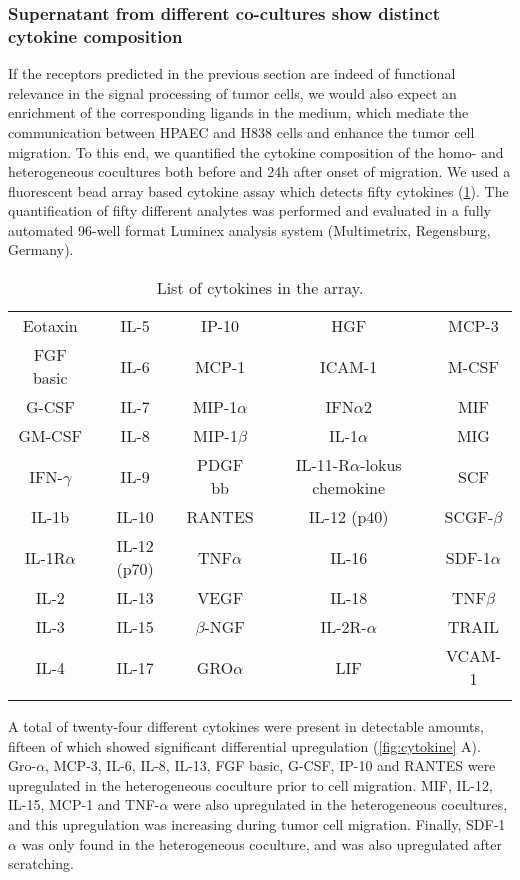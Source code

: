 \subsubsection{Supernatant  from different co-cultures show distinct cytokine composition}

If the receptors predicted in the previous section are indeed of functional
relevance in the signal processing of tumor cells, we would also expect an
enrichment of the corresponding ligands in the medium,
which mediate the communication between
HPAEC and H838 cells and enhance the tumor cell migration.
To this end, we quantified the cytokine composition
of the  homo- and heterogeneous cocultures
both before and 24h after onset of migration.
We used a  fluorescent bead array based cytokine assay which detects fifty cytokines (\ref{table:cytokine}).
The quantification of fifty different analytes was performed and evaluated in a  fully automated 96-well format Luminex analysis system (Multimetrix, Regensburg,  Germany). 

\begin{longtable}{ccccc}
\caption{List of cytokines in the array.} \\ 
\hline
Eotaxin & IL-5 &   IP-10 &  HGF & MCP-3\\
\rowcolor{Gray} FGF basic &  IL-6 &   MCP-1 &  ICAM-1 & M-CSF\\
G-CSF &  IL-7 &   MIP-1$\alpha$ & IFN$\alpha$2 & MIF\\
\rowcolor{Gray} GM-CSF & IL-8 &   MIP-1$\beta$ &  IL-1$\alpha$ & MIG\\
IFN-$\gamma$ &  IL-9&    PDGF bb&  IL-11-R$\alpha$-lokus chemokine & SCF\\
\rowcolor{Gray} IL-1b &  IL-10 &  RANTES & IL-12 (p40) & SCGF-$\beta$\\
IL-1R$\alpha$ &  IL-12 (p70) &  TNF$\alpha$ &   IL-16 &  SDF-1$\alpha$\\
\rowcolor{Gray} IL-2 &   IL-13 &  VEGF &   IL-18 &  TNF$\beta$\\
IL-3 &   IL-15 &  $\beta$-NGF&  IL-2R-$\alpha$ &   TRAIL\\
\rowcolor{Gray} IL-4 &   IL-17 &  GRO$\alpha$ &  LIF &VCAM-1\\
\hline
\label{table:cytokine}
\end{longtable}
\newpage

A total of twenty-four different cytokines were present in detectable amounts,
fifteen of which showed significant differential upregulation
(\ref{fig:cytokine} A).
Gro-$\alpha$, MCP-3, IL-6, IL-8, IL-13, FGF basic, G-CSF, IP-10 and RANTES were
upregulated in the heterogeneous coculture prior to cell migration.
MIF, IL-12, IL-15, MCP-1 and TNF-$\alpha$ were also upregulated
in the heterogeneous cocultures, and this upregulation was increasing
during tumor cell migration.
Finally, SDF-1$\alpha$ was only found in the heterogeneous coculture,
and was also upregulated after scratching. 

